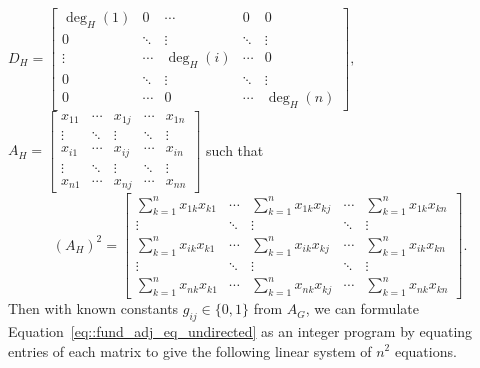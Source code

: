 \documentclass[11pt]{report}
\begin{document}
$\displaystyle 
D_H =
\begin{bmatrix}
\deg_H(1) & 0      & \cdots & 0 & 0      \\
0         & \ddots & \vdots & \ddots & \vdots \\
\vdots    & \cdots & \deg_H(i) & \cdots & 0      \\
0         & \ddots & \vdots & \ddots & \vdots \\
0         & \cdots & 0      & \cdots & \deg_H(n)
\end{bmatrix}, 
$ 
$\displaystyle A_H =
\begin{bmatrix}
x_{11} & \cdots & x_{1j} & \cdots & x_{1n} \\
\vdots  & \ddots  & \vdots & \ddots & \vdots  \\
x_{i1} & \cdots & x_{ij} & \cdots & x_{in} \\
\vdots  & \ddots  & \vdots & \ddots & \vdots  \\
x_{n1} & \cdots & x_{nj} & \cdots & x_{nn}
\end{bmatrix}
$ such that 
\[
(A_H)^2 = \begin{bmatrix}
\displaystyle \sum_{k=1}^n x_{1k}x_{k1} & \cdots & \displaystyle \sum_{k=1}^n x_{1k}x_{kj} & \cdots & \displaystyle \sum_{k=1}^n x_{1k}x_{kn} \\
\vdots  & \ddots  & \vdots & \ddots & \vdots  \\
\displaystyle \sum_{k=1}^n x_{ik}x_{k1} & \cdots & \displaystyle \sum_{k=1}^n x_{ik}x_{kj} & \cdots & \displaystyle \sum_{k=1}^n x_{ik}x_{kn} \\
\vdots  & \ddots  & \vdots & \ddots & \vdots  \\
\displaystyle \sum_{k=1}^n x_{nk}x_{k1} & \cdots & \displaystyle \sum_{k=1}^n x_{nk}x_{kj} & \cdots & \displaystyle \sum_{k=1}^n x_{nk}x_{kn}
\end{bmatrix}.
\]
Then with known constants $g_{ij} \in \{0, 1\}$ from $A_G$, we can formulate Equation~\eqref{eq::fund_adj_eq_undirected} as an integer program by equating entries of each matrix to give the following linear system of $n^2$ equations.
\end{document}
